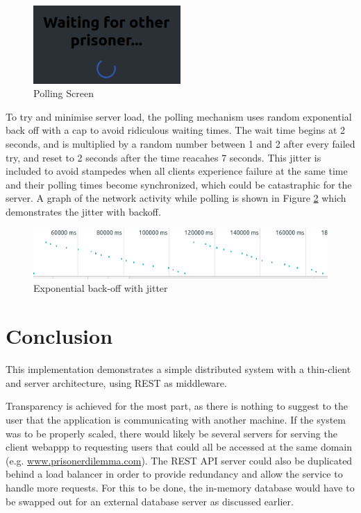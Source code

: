 \documentclass[12pt]{article}
\begin{document}
\begin{figure}[!ht]
        \centering
        \includegraphics[width=0.5\textwidth]{images/polling} %
        \caption{Polling Screen}
        \label{fig:polling}
\end{figure}

To try and minimise server load, the polling mechanism uses random exponential back off with a cap to avoid ridiculous waiting times. The wait time begins at 2 seconds, and is multiplied by a random number between 1 and 2 after every failed try, and reset to 2 seconds after the time reacahes 7 seconds. This jitter is included to avoid stampedes when all clients experience failure at the same time and their polling times become synchronized, which could be catastraphic for the server. A graph of the network activity while polling is shown in Figure \ref{fig:jitter} which demonstrates the jitter with backoff.

\begin{figure}[!ht]
        \centering
        \includegraphics[width=\textwidth]{images/jitter} %
        \caption{Exponential back-off with jitter}
        \label{fig:jitter}
\end{figure}

\part*{Conclusion}

This implementation demonstrates a simple distributed system with a thin-client and server architecture, using REST as middleware. 

Transparency is achieved for the most part, as there is nothing to suggest to the user that the application is communicating with another machine. If the system was to be properly scaled, there would likely be several servers for serving the client webappp to requesting users that could all be accessed at the same domain (e.g. \url{www.prisonerdilemma.com}). The REST API server could also be duplicated behind a load balancer in order to provide redundancy and allow the service to handle more requests. For this to be done, the in-memory database would have to be swapped out for an external database server as discussed earlier. 



\end{document}
